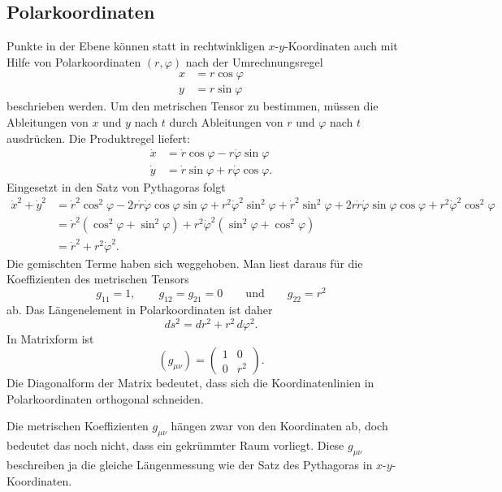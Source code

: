 \subsection{Polarkoordinaten}
Punkte in der Ebene können statt in rechtwinkligen $x$-$y$-Koordinaten
auch mit Hilfe von Polarkoordinaten $(r,\varphi)$ nach der Umrechnungsregel
\begin{align*}
x&=r\cos\varphi\\
y&=r\sin\varphi
\end{align*}
beschrieben werden.
Um den metrischen Tensor zu bestimmen, müssen die Ableitungen von $x$ 
und $y$ nach $t$ durch Ableitungen von $r$ und $\varphi$ nach $t$ 
ausdrücken.
Die Produktregel liefert:
\begin{align*}
\dot x&= \dot r\cos \varphi - r\dot\varphi \sin\varphi 
\\
\dot y&= \dot r\sin\varphi + r\dot\varphi\cos\varphi.
\end{align*}
Eingesetzt in den Satz von Pythagoras folgt
\begin{align*}
\dot x^2 + \dot y^2
&=
\dot r^2\cos^2\varphi -2r\dot r\dot\varphi\cos\varphi\sin\varphi +r^2\dot \varphi^2\sin^2\varphi
+
\dot r^2\sin^2\varphi +2r\dot r\dot\varphi\sin\varphi\cos\varphi +r^2\dot\varphi^2\cos^2\varphi
\\
&=
\dot r^2(\cos^2\varphi+\sin^2\varphi)+ r^2\dot\varphi^2(\sin^2\varphi+\cos^2\varphi)
\\
&=\dot r^2 + r^2\dot\varphi^2.
\end{align*}
Die gemischten Terme haben sich weggehoben.
Man liest daraus für die Koeffizienten des metrischen Tensors
\[
g_{11}=1,\qquad g_{12}=g_{21}=0\qquad\text{und}\qquad g_{22}=r^2
\]
ab.
Das Längenelement in Polarkoordinaten ist daher
\[
ds^2
=
dr^2 + r^2\,d\varphi^2.
\]
%
In Matrixform ist
\[
(g_{\mu\nu})
=
\begin{pmatrix}
1&0\\0&r^2
\end{pmatrix}.
\]
Die Diagonalform der Matrix bedeutet, dass sich die Koordinatenlinien
in Polarkoordinaten orthogonal schneiden.

Die metrischen Koeffizienten $g_{\mu\nu}$ hängen zwar von den Koordinaten ab,
doch bedeutet das noch nicht, dass ein gekrümmter Raum vorliegt.
Diese $g_{\mu\nu}$ beschreiben ja die gleiche Längenmessung wie der Satz
des Pythagoras in $x$-$y$-Koordinaten.


